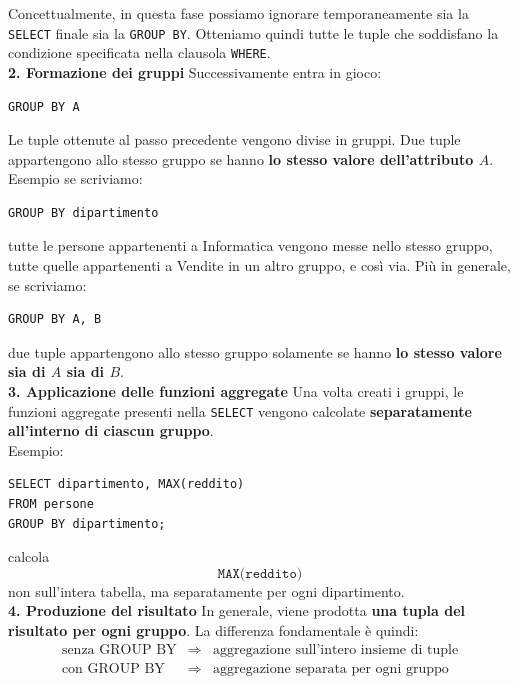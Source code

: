 Concettualmente, in questa fase possiamo ignorare temporaneamente
sia la \texttt{SELECT} finale sia la \texttt{GROUP BY}.
Otteniamo quindi tutte le tuple che soddisfano la condizione
specificata nella clausola \texttt{WHERE}.\medskip\\
\textbf{2. Formazione dei gruppi}
Successivamente entra in gioco:
\begin{verbatim}
GROUP BY A
\end{verbatim}
Le tuple ottenute al passo precedente vengono divise in gruppi.
Due tuple appartengono allo stesso gruppo se hanno
\textbf{lo stesso valore dell'attributo $A$}.\\
\textcolor{verdeEsempio}{Esempio} se scriviamo:
\begin{verbatim}
GROUP BY dipartimento
\end{verbatim}
tutte le persone appartenenti a Informatica vengono messe nello
stesso gruppo, tutte quelle appartenenti a Vendite in un altro
gruppo, e così via.
Più in generale, se scriviamo:
\begin{verbatim}
GROUP BY A, B
\end{verbatim}
due tuple appartengono allo stesso gruppo solamente se hanno
\textbf{lo stesso valore sia di $A$ sia di $B$}.\medskip\\
\textbf{3. Applicazione delle funzioni aggregate}
Una volta creati i gruppi, le funzioni aggregate presenti nella
\texttt{SELECT} vengono calcolate
\textbf{separatamente all'interno di ciascun gruppo}.\\
\textcolor{verdeEsempio}{Esempio:}
\begin{verbatim}
SELECT dipartimento, MAX(reddito)
FROM persone
GROUP BY dipartimento;
\end{verbatim}
calcola
\[
\texttt{MAX(reddito)}
\]
non sull'intera tabella, ma separatamente per ogni dipartimento.\medskip\\
\textbf{4. Produzione del risultato}
In generale, viene prodotta \textbf{una tupla del risultato per ogni
gruppo}.
La differenza fondamentale è quindi:
\[
\begin{array}{ccl}
\text{senza GROUP BY}
&\Rightarrow&
\text{aggregazione sull'intero insieme di tuple}
\\[2mm]
\text{con GROUP BY}
&\Rightarrow&
\text{aggregazione separata per ogni gruppo}
\end{array}
\]
